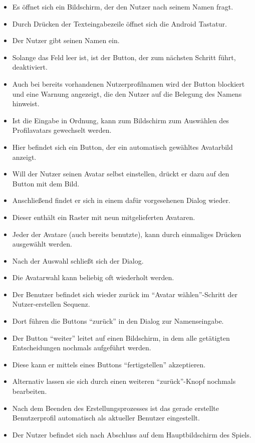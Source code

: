 \begin{itemize}
\item Es öffnet sich ein Bildschirm, der den Nutzer nach seinem Namen fragt.
\item Durch Drücken der Texteingabezeile öffnet sich die Android Tastatur.
\item Der Nutzer gibt seinen Namen ein. 
\item Solange das Feld leer ist, ist der Button, der zum nächsten Schritt führt, deaktiviert.
\item  Auch bei bereits vorhandenen Nutzerprofilnamen wird der Button blockiert und eine Warnung angezeigt,
die den Nutzer auf die Belegung des Namens hinweist. 
\item Ist die Eingabe in Ordnung, kann zum Bildschirm zum Auswählen des Profilavatars gewechselt werden.
\item Hier befindet sich ein Button, der ein automatisch gewähltes Avatarbild anzeigt.
\item Will der Nutzer seinen Avatar selbst einstellen, drückt er dazu auf den Button mit dem Bild.
\item Anschließend findet er sich in einem dafür vorgesehenen Dialog wieder.
\item Dieser enthält ein Raster mit neun mitgelieferten Avataren.
\item Jeder der Avatare (auch bereits benutzte), kann durch einmaliges Drücken ausgewählt werden.
\item Nach der Auswahl schließt sich der Dialog.
\item Die Avatarwahl kann beliebig oft wiederholt werden.
\item Der Benutzer befindet sich wieder zurück im "`Avatar wählen"'-Schritt der Nutzer-erstellen Sequenz.
\item Dort führen die Buttons "`zurück"' in den Dialog zur Namenseingabe.
\item Der Button "`weiter"' leitet auf einen Bildschirm, in dem alle getätigten Entscheidungen
nochmals aufgeführt werden. 
\item Diese kann er mittels eines Buttons "`fertigstellen"' akzeptieren.
\item Alternativ lassen sie sich durch einen weiteren "`zurück"'-Knopf 
nochmals bearbeiten.
\item Nach dem Beenden des Erstellungsprozesses ist das gerade erstellte 
Benutzerprofil automatisch als aktueller Benutzer eingestellt.
\item Der Nutzer befindet sich nach Abschluss auf dem Hauptbildschirm des Spiels.
\end{itemize}
